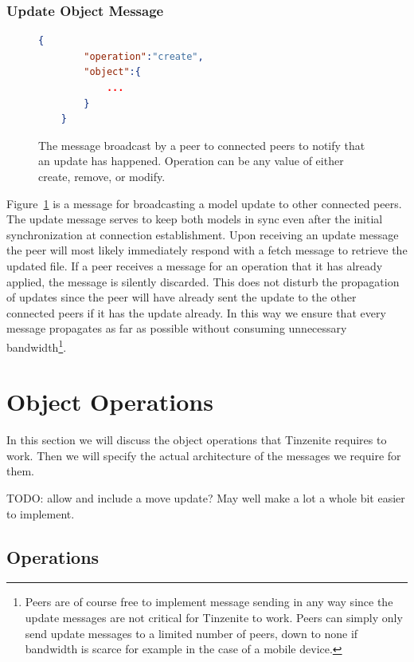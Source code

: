 \subsubsection{Update Object Message}
\label{subs:Update Object Message}

\begin{figure}[htp]
    \begin{lstlisting}[language=json,firstnumber=0]
    {
        "operation":"create",
        "object":{
            ...
        }
    }
    \end{lstlisting}
\caption[Update Object Message]{The message broadcast by a peer to connected peers to notify that an update has happened. Operation can be any value of either create, remove, or modify.}
\label{json:update_object}
\end{figure}

Figure~\ref{json:update_object} is a message for broadcasting a model update to other connected peers.
The update message serves to keep both models in sync even after the initial synchronization at connection establishment.
Upon receiving an update message the peer will most likely immediately respond with a fetch message to retrieve the updated file.
If a peer receives a message for an operation that it has already applied, the message is silently discarded.
This does not disturb the propagation of updates since the peer will have already sent the update to the other connected peers if it has the update already.
In this way we ensure that every message propagates as far as possible without consuming unnecessary bandwidth\footnote{Peers are of course free to implement message sending in any way since the update messages are not critical for Tinzenite to work. Peers can simply only send update messages to a limited number of peers, down to none if bandwidth is scarce for example in the case of a mobile device.}.

\section{Object Operations}
\label{sec:Object Operations}

In this section we will discuss the object operations that Tinzenite requires to work.
Then we will specify the actual architecture of the messages we require for them.

TODO: allow and include a move update?
May well make a lot a whole bit easier to implement.

\subsection{Operations}
\label{sub:Operations}


